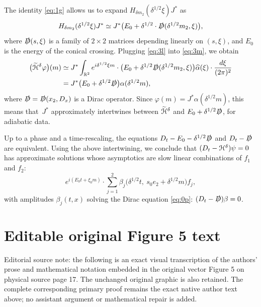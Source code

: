 \documentclass[11pt]{article}
\numberwithin{equation}{section}
\let\pazocal\EuScript
\theoremstyle{definition}
\newcommand{\HH}{\pazocal{H}}
\newcommand{\tHH}{\widetilde{\HH}{}}
\newcommand{\R}{\mathbb{R}}
\let\az\alpha
\let\vp\varphi
\newcommand{\haz}{{\widehat{\az}}}
\newcommand{\Di}{\slashed{D}}
\begin{document}
The identity \eqref{eq:1g} allows us to expand $H_{\delta m_2}(\delta^{1/2} \xi) J^*$ as
\begin{equation}\label{eq:3l}
H_{\delta m_2}(\delta^{1/2} \xi) J^* \simeq J^* \bigl( E_0 + \delta^{1/2} \cdot \Di(\delta^{1/2} m_2, \xi) \bigr),
\end{equation}
where $\Di(s,\xi)$ is a family of $2 \times 2$ matrices depending linearly on $(s,\xi)$, and $E_0$ is the energy of the conical crossing. Plugging \eqref{eq:3l} into \eqref{eq:3m}, we obtain
\begin{align*}
\bigl(\tHH^\delta \vp \bigr)(m) &\simeq J^*\int_{\R^2} e^{i\delta^{1/2} \xi m} \cdot \bigl( E_0 + \delta^{1/2} \Di(\delta^{1/2} m_2, \xi) \bigr) \haz(\xi) \cdot \dfrac{d\xi}{(2\pi )^2}\\
&= J^* \bigl( E_0 + \delta^{1/2} \Di\bigr) \az (\delta^{1/2} m),
\end{align*}
where $\Di = \Di(x_2, D_x)$ is a Dirac operator. Since $\vp(m) = J^*\az(\delta^{1/2}m)$, this means that~$J^*$ approximately intertwines between $\tHH^\delta$ and $E_0 + \delta^{1/2} \Di$, for adiabatic data.

Up to a phase and a time-rescaling, the equations $D_t - E_0 - \delta^{1/2} \Di$ and $D_t - \Di$ are equivalent. Using the above intertwining, we conclude that
$(D_t-\HH^\delta) \psi = 0$ has approximate solutions whose asymptotics are slow linear combinations of $f_1$ and $f_2$:
\begin{equation*}
e^{i(E_0 t + \xi_0 m)} \cdot \sum_{j=1}^2 \beta_j\bigl( \delta^{1/2} t, \ s_0 e_2 + \delta^{1/2} m \bigr) f_j,
\end{equation*}
with amplitudes $\beta_j(t,x)$ solving the Dirac equation \eqref{eq:0p}: $(D_t - \Di) \beta = 0$.



\clearpage
\section*{Editable original Figure 5 text}
\noindent Editorial source note: the following is an exact visual transcription of the authors' prose and mathematical notation embedded in the original vector Figure 5 on physical source page 17. The unchanged original graphic is also retained. The complete corresponding primary proof remains the exact native author text above; no assistant argument or mathematical repair is added.

\end{document}
